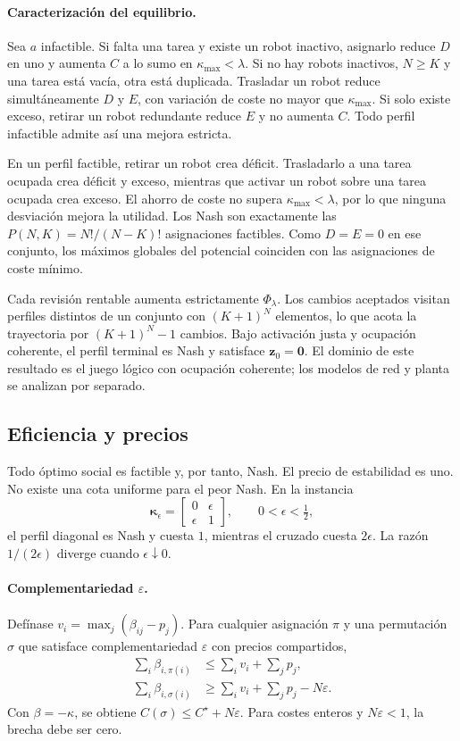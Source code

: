 \paragraph{Caracterización del equilibrio.}
Sea $a$ infactible. Si falta una tarea y existe un robot inactivo, asignarlo reduce $D$ en uno y aumenta $C$ a lo sumo en $\kappa_{\max}<\lambda$. Si no hay robots inactivos, $N\geq K$ y una tarea está vacía, otra está duplicada. Trasladar un robot reduce simultáneamente $D$ y $E$, con variación de coste no mayor que $\kappa_{\max}$. Si solo existe exceso, retirar un robot redundante reduce $E$ y no aumenta $C$. Todo perfil infactible admite así una mejora estricta.

En un perfil factible, retirar un robot crea déficit. Trasladarlo a una tarea ocupada crea déficit y exceso, mientras que activar un robot sobre una tarea ocupada crea exceso. El ahorro de coste no supera $\kappa_{\max}<\lambda$, por lo que ninguna desviación mejora la utilidad. Los Nash son exactamente las $P(N,K)=N!/(N-K)!$ asignaciones factibles. Como $D=E=0$ en ese conjunto, los máximos globales del potencial coinciden con las asignaciones de coste mínimo.

Cada revisión rentable aumenta estrictamente \(\Phi_\lambda\). Los cambios aceptados visitan perfiles distintos de un conjunto con \((K+1)^N\) elementos, lo que acota la trayectoria por \((K+1)^N-1\) cambios. Bajo activación justa y ocupación coherente, el perfil terminal es Nash y satisface \(\boldsymbol z_0=\boldsymbol0\). El dominio de este resultado es el juego lógico con ocupación coherente; los modelos de red y planta se analizan por separado.

\subsection{Eficiencia y precios}
\label{app:proof-sp0-poa}

Todo óptimo social es factible y, por tanto, Nash. El precio de estabilidad es uno. No existe una cota uniforme para el peor Nash. En la instancia
\[
\boldsymbol\kappa_\epsilon=
\begin{bmatrix}0&\epsilon\\ \epsilon&1\end{bmatrix},
\qquad 0<\epsilon<\tfrac12,
\]
el perfil diagonal es Nash y cuesta $1$, mientras el cruzado cuesta $2\epsilon$. La razón $1/(2\epsilon)$ diverge cuando $\epsilon\downarrow0$.

\paragraph{Complementariedad $\varepsilon$.}
Defínase $v_i=\max_j(\beta_{ij}-p_j)$. Para cualquier asignación $\pi$ y una permutación $\sigma$ que satisface complementariedad $\varepsilon$ con precios compartidos,
\begin{align*}
 \sum_i\beta_{i,\pi(i)}&\leq\sum_iv_i+\sum_jp_j,\\
 \sum_i\beta_{i,\sigma(i)}&\geq\sum_iv_i+\sum_jp_j-N\varepsilon.
\end{align*}
Con $\beta=-\kappa$, se obtiene $C(\sigma)\leq C^\star+N\varepsilon$. Para costes enteros y $N\varepsilon<1$, la brecha debe ser cero.

